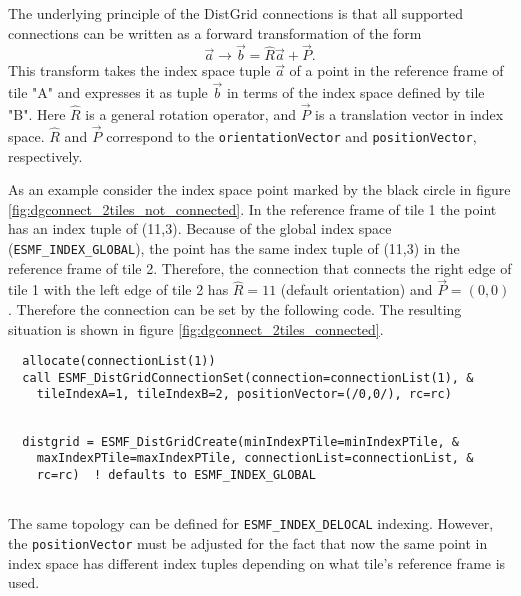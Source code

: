    The underlying principle of the DistGrid connections is that all supported
   connections can be written as a forward transformation of the form
   \begin{equation}
   \label{eqn:dg_forward_connect_form}
   \vec a \rightarrow \vec b = \hat R \vec a + \vec P.
   \end{equation}
   This transform takes the index space tuple $\vec a$ of a point in the 
   reference frame of tile "A" and expresses it as tuple $\vec b$ in terms of
   the index space defined by tile "B". Here $\hat R$
   is a general rotation operator, and $\vec P$ is a translation vector in index
   space. $\hat R$ and $\vec P$ correspond to the {\tt orientationVector} and
   {\tt positionVector}, respectively.
  
   As an example consider the index space point marked by the black circle in
   figure \ref{fig:dgconnect_2tiles_not_connected}. In the reference frame of
   tile 1 the point has an index tuple of (11,3). Because of the global index
   space ({\tt ESMF\_INDEX\_GLOBAL}), the point has the same index
   tuple of (11,3) in the reference frame of tile 2. Therefore, the connection
   that connects the right edge of tile 1 with the left edge of tile 2 has
   $\hat R ={1\!\!1}$ (default orientation) and $\vec P = (0,0)$. Therefore 
   the connection can be set by the following code. The resulting situation is
   shown in figure \ref{fig:dgconnect_2tiles_connected}. 

 \begin{verbatim}
  allocate(connectionList(1))
  call ESMF_DistGridConnectionSet(connection=connectionList(1), &
    tileIndexA=1, tileIndexB=2, positionVector=(/0,0/), rc=rc)
 
\end{verbatim}
 

 \begin{verbatim}
  distgrid = ESMF_DistGridCreate(minIndexPTile=minIndexPTile, &
    maxIndexPTile=maxIndexPTile, connectionList=connectionList, &
    rc=rc)  ! defaults to ESMF_INDEX_GLOBAL
 
\end{verbatim}
 

   The same topology can be defined for {\tt ESMF\_INDEX\_DELOCAL} indexing.
   However, the {\tt positionVector} must be adjusted for the fact that now
   the same point in index space has different index tuples depending on what
   tile's reference frame is used.
  
